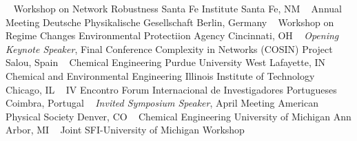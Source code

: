 ~
\Gap
{}
Workshop on Network Robustness
\newline
    Santa Fe Institute
    \newline
Santa Fe, NM
\newline
~
\Gap
{}
Annual Meeting
\newline
    Deutsche Physikalische Gesellschaft
    \newline
Berlin, Germany
\newline
~
\Gap
{}
Workshop on Regime Changes
\newline
    Environmental Protectiion Agency
    \newline
Cincinnati, OH
\newline
~
\Gap
{}
\textit{Opening Keynote Speaker}, Final Conference
\newline
    Complexity in Networks (COSIN) Project
    \newline
Salou, Spain
\newline
~
\Gap
{}
Chemical Engineering
\newline
    Purdue University
    \newline
West Lafayette, IN
\newline
~
\Gap
{}
Chemical and Environmental Engineering
\newline
    Illinois Institute of Technology
    \newline
Chicago, IL
\newline
~
\Gap
{}
IV Encontro
\newline
    Forum Internacional de Investigadores Portugueses
    \newline
Coimbra, Portugal
\newline
~
\Gap
{}
\textit{Invited Symposium Speaker}, April Meeting
\newline
    American Physical Society 
    \newline
Denver, CO
\newline
~
\Gap
{}
Chemical Engineering
\newline
    University of Michigan
    \newline
Ann Arbor, MI
\newline
~
\Gap
{}
Joint SFI-University of Michigan Workshop
